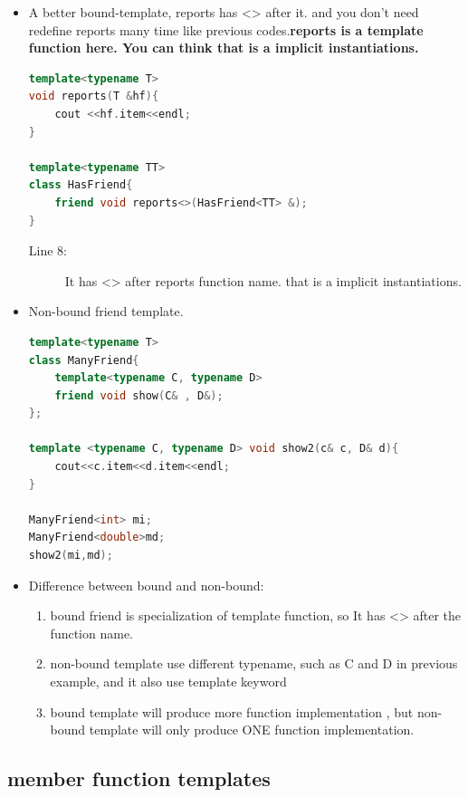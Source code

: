 \documentclass[a4paper,11pt,twoside]{book}
\begin{document}
\begin{itemize}
	\item A better bound-template, reports has <> after it.  and you don't need redefine reports many time like previous codes.\textbf{reports is a template function here. You can think that is a implicit instantiations. }
\begin{lstlisting}[frame=single, language=c++]
template<typename T>
void reports(T &hf){
	cout <<hf.item<<endl;
}

template<typename TT>
class HasFriend{
	friend void reports<>(HasFriend<TT> &);
}
\end{lstlisting}
\begin{description}
	\item[Line 8:] It has <> after reports function name. that is a implicit instantiations.
\end{description}

	\item Non-bound friend template.
\begin{lstlisting}[frame=single, language=c++]
template<typename T>
class ManyFriend{
	template<typename C, typename D>
	friend void show(C& , D&);
};
	
template <typename C, typename D> void show2(c& c, D& d){
	cout<<c.item<<d.item<<endl;
}
	
ManyFriend<int> mi;
ManyFriend<double>md;
show2(mi,md);
\end{lstlisting}
	
	\item Difference between bound and non-bound:
	
	\begin{enumerate}
		\item bound friend is specialization of template function, so It has <> after the function name.
		
		\item non-bound template use different typename, such as C and D in previous example, and it also use template keyword
		
		\item bound template will produce more function implementation , but non-bound template will only produce ONE function implementation.
	\end{enumerate}
\end{itemize}

\subsection{member function templates}
\end{document}
